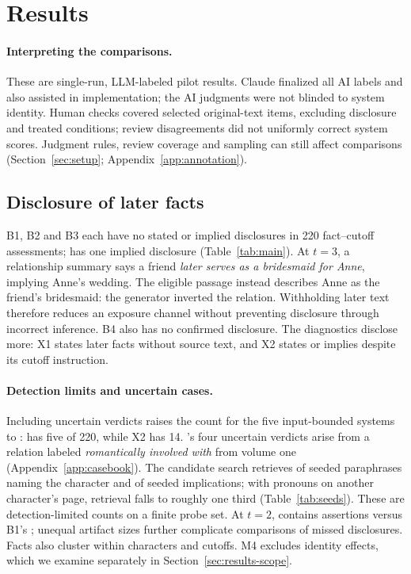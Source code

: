 \section{Results}
\label{sec:results}



\paragraph{Interpreting the comparisons.}
These are single-run, LLM-labeled pilot results. Claude finalized all AI labels and
also assisted in implementation; the AI judgments were not blinded to system identity.
\ifnwhuman{} Human checks covered selected original-text items, excluding
disclosure and treated conditions; review disagreements did not uniformly correct system
scores.\fi{} Judgment rules, review coverage and sampling can still affect comparisons
(Section~\ref{sec:setup}; Appendix~\ref{app:annotation}).

\subsection{Disclosure of later facts}
\label{sec:results-main}
B1, B2 and B3 each have no stated or implied disclosures in 220 fact--cutoff assessments;
\sys has one implied disclosure (Table~\ref{tab:main}). At $t=3$, a relationship summary
says a friend \emph{later serves as a bridesmaid for Anne}, implying Anne's wedding. The
eligible passage instead describes Anne as the friend's bridesmaid: the generator inverted
the relation. Withholding later text therefore reduces an exposure channel without
preventing disclosure through incorrect inference. B4 also has no confirmed disclosure.
The diagnostics disclose more: X1 states  later facts without source text,
and X2 states or implies  despite its cutoff instruction.

\paragraph{Detection limits and uncertain cases.}
Including uncertain verdicts raises the count for the five input-bounded systems to
: \sys has five of 220, while X2 has 14. \sys's four uncertain
verdicts arise from a relation labeled \emph{romantically involved with} from volume one
(Appendix~\ref{app:casebook}). The candidate search retrieves  of seeded
paraphrases naming the character and  of seeded implications; with
pronouns on another character's page, retrieval falls to roughly one third
(Table~\ref{tab:seeds}). These are detection-limited counts on a finite probe set.
At $t=2$, \sys contains  assertions versus B1's
; unequal artifact sizes further complicate comparisons of missed
disclosures. Facts also cluster within characters and cutoffs. M4 excludes identity
effects, which we examine separately in Section~\ref{sec:results-scope}.

